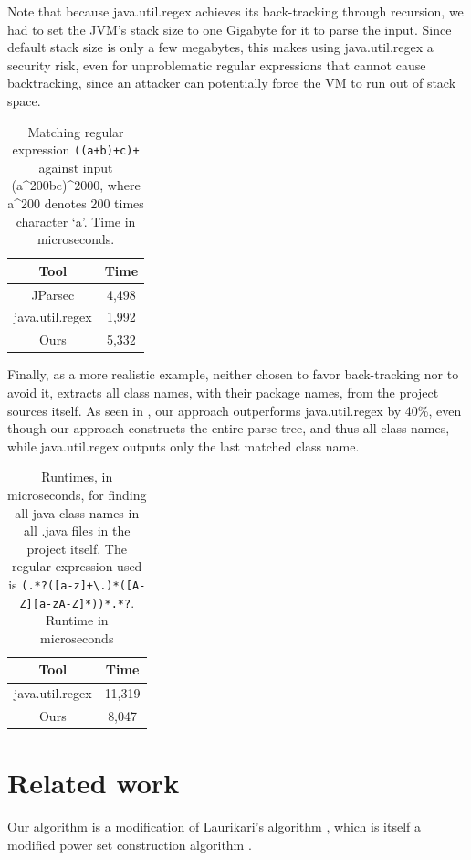 \documentclass[english]{sigplanconf}
\theoremstyle{definition}
\begin{document}

Note that because java.util.regex achieves its back-tracking through recursion,
we had to set the JVM's stack size to one Gigabyte for it to parse the input.
Since default stack size is only a few megabytes, this makes using
java.util.regex a security risk, even for unproblematic regular expressions
that cannot cause backtracking, since an attacker can potentially force the VM to run 
out of stack space.

\begin{table}[htp]
\begin{tabular}{cc}
\toprule
Tool & Time\tabularnewline
\midrule
JParsec & 4,498\tabularnewline
java.util.regex & 1,992\tabularnewline
Ours & 5,332\tabularnewline
\bottomrule
\end{tabular}
\caption{Matching regular expression \texttt{((a+b)+c)+} against input (a\^{}200bc)\^{}2000, where a\^{}200 denotes 200 times character `a'. Time in microseconds.}
\end{table}

Finally, as a more realistic example, neither chosen to favor
back-tracking nor to avoid it,  extracts all class names, with their
package names, from the project sources itself.  As seen in
, our approach outperforms java.util.regex by 40\%,
even though our approach constructs the entire parse tree, and thus
all class names, while java.util.regex outputs only the last matched
class name.

\begin{table}[htp]
\begin{tabular}{cc}
\toprule
Tool & Time\tabularnewline
\midrule
java.util.regex & 11,319\tabularnewline
Ours & 8,047\tabularnewline
\bottomrule
\end{tabular}
\caption{Runtimes, in microseconds, for finding all java class names in all .java files in the project itself. The regular expression used is 
\texttt{(.*?([a-z]+\textbackslash.)*([A-Z][a-zA-Z]*))*.*?}.
Runtime in microseconds}
\end{table}


\section{Related work}
Our algorithm is a modification of Laurikari's algorithm \cite{Laur00a},
which is itself a modified power set construction algorithm \cite[p. 55]{Sips05a}.
\end{document}
